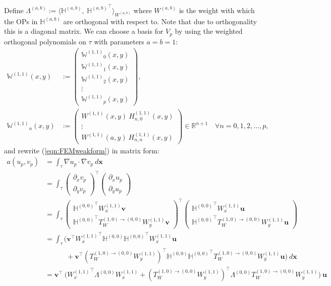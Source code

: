 \documentclass[11pt, oneside]{article}   	%
\newcommand{\R}{\mathbb{R}}
\newcommand{\hdop}{H}
\newcommand{\bighdop}{\mathbb{\hdop}}
\newcommand{\Wii}{W^{(1,1)}}
\newcommand{\hdopii}{\hdop^{(1,1)}}
\newcommand{\bighdopoo}{{\mathbb{\hdop}^{(0,0)}}}
\newcommand{\element}{\tau}
\newcommand{\bigWii}{{\mathbb{W}^{(1,1)}}}
\begin{document}
Define $\Lambda^{(a,b)} := \langle \bighdop^{(a,b)}, \: {\bighdop^{(a,b)}}^\top \rangle_{W^{(a,b)}}$ where $W^{(a,b)}$ is the weight with which the OPs in $\bighdop^{(a,b)}$ are orthogonal with respect to. Note that due to orthogonality this is a diagonal matrix. We can choose a basis for $V_p$ by using the weighted orthogonal polynomials on $\element$ with parameters $a = b = 1$:
\begin{align*}
\bigWii(x,y) &:= \begin{pmatrix}
		\bigWii_0(x,y) \\
		\bigWii_1(x,y) \\
		\bigWii_2(x,y) \\
		\vdots \\
		\bigWii_p(x,y)
	\end{pmatrix}, \\
\bigWii_n(x,y) &:= \begin{pmatrix}
		\Wii(x,y) \: \hdopii_{n,0}(x,y) \\
		\vdots \\
		\Wii(a,y) \: \hdopii_{n,n}(x,y)
	\end{pmatrix} \in \R^{n+1} \quad \forall n = 0,1,2,\dots,p,
\end{align*}
and rewrite (\ref{eqn:FEMweakform}) in matrix form:
\begin{align*}
	a(u_p,v_p) &= \int_\element \nabla u_p \cdot \nabla v_p \: d\mathbf{x} \\
	&= \int_\element \begin{pmatrix}
					\partial_x v_p \\
					\partial_y v_p
				\end{pmatrix}^\top 
				\begin{pmatrix}
					\partial_x u_p \\
					\partial_y u_p
				\end{pmatrix}
				\\
	&= \int_\element \begin{pmatrix}
					\bighdopoo^\top \Wii_x \mathbf{v} \\
					\bighdopoo^\top T_W^{(1,0)\to(0,0)} \Wii_y \mathbf{v}
				\end{pmatrix}^\top 
				\begin{pmatrix}
					\bighdopoo^\top \Wii_x \mathbf{u} \\
					\bighdopoo^\top T_W^{(1,0)\to(0,0)} \Wii_y \mathbf{u}
				\end{pmatrix}
				\\
	&= \int_\element \Big( \mathbf{v}^\top {\Wii_x}^\top \bighdopoo \bighdopoo^\top \Wii_x \mathbf{u} \nonumber \\
					& \quad \quad \quad + \mathbf{v}^\top ({T_W^{(1,0)\to(0,0)} \Wii_y})^\top \bighdopoo \bighdopoo^\top T_W^{(1,0)\to(0,0)} \Wii_y \mathbf{u}  \Big) \: d\mathbf{x} \\
	&= \mathbf{v}^\top \: \Big( {\Wii_x}^\top \Lambda^{(0,0)} \Wii_x + ({T_W^{(1,0)\to(0,0)} \Wii_y})^\top \Lambda^{(0,0)} T_W^{(1,0)\to(0,0)} \Wii_y \Big) \: \mathbf{u}
\end{align*}
\end{document}
